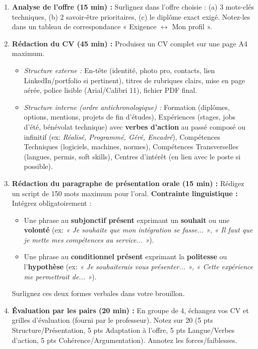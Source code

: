 \documentclass[11pt]{article}
\newcounter{popsec}
\newcounter{popsub}
\newcommand{\courssub}[1]{%
  \stepcounter{popsub}%
  \par\vspace{9pt}\noindent{\popxbold\fontsize{11.5}{13}\selectfont\color{popink}{\color{poporange}\thepopsec.\thepopsub}\hspace{6pt}#1}\par\nopagebreak\vspace{4pt}
}
\begin{document}
\courssub{Consignes}
\begin{enumerate}
    \item \textbf{Analyse de l'offre (15 min) :} Surlignez dans l'offre choisie : (a) 3 mots-clés techniques, (b) 2 savoir-être prioritaires, (c) le diplôme exact exigé. Notez-les dans un tableau de correspondance « Exigence $\leftrightarrow$ Mon profil ».
    \item \textbf{Rédaction du CV (45 min) :} Produisez un CV complet sur une page A4 maximum.
        \begin{itemize}
            \item \textit{Structure externe :} En-tête (identité, photo pro, contacts, lien LinkedIn/portfolio si pertinent), titres de rubriques clairs, mise en page aérée, police lisible (Arial/Calibri 11), fichier PDF final.
            \item \textit{Structure interne (ordre antichronologique) :} Formation (diplômes, options, mentions, projets de fin d'études), Expériences (stages, jobs d'été, bénévolat technique) avec \textbf{verbes d'action} au passé composé ou infinitif (ex: \emph{Réalisé, Programmé, Géré, Encadré}), Compétences Techniques (logiciels, machines, normes), Compétences Transverselles (langues, permis, soft skills), Centres d'intérêt (en lien avec le poste si possible).
        \end{itemize}
    \item \textbf{Rédaction du paragraphe de présentation orale (15 min) :} Rédigez un script de 150 mots maximum pour l'oral. \textbf{Contrainte linguistique :} Intégrez obligatoirement :
        \begin{itemize}
            \item Une phrase au \textbf{subjonctif présent} exprimant un \textbf{souhait} ou une \textbf{volonté} (ex: \emph{« Je souhaite que mon intégration se fasse... »}, \emph{« Il faut que je mette mes compétences au service... »}).
            \item Une phrase au \textbf{conditionnel présent} exprimant la \textbf{politesse} ou l'\textbf{hypothèse} (ex: \emph{« Je souhaiterais vous présenter... »}, \emph{« Cette expérience me permettrait de... »}).
        \end{itemize}
        Surlignez ces deux formes verbales dans votre brouillon.
    \item \textbf{Évaluation par les pairs (20 min) :} En groupe de 4, échangez vos CV et grilles d'évaluation (fourni par le professeur). Notez sur 20 (5 pts Structure/Présentation, 5 pts Adaptation à l'offre, 5 pts Langue/Verbes d'action, 5 pts Cohérence/Argumentation). Annotez les forces/faiblesses.

\end{enumerate}
\end{document}
